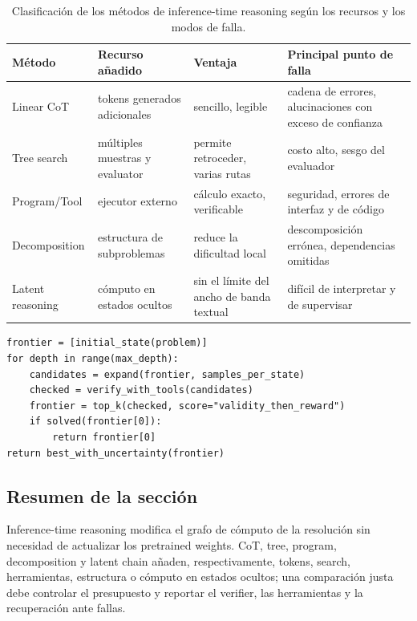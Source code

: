 \begin{table}[H]
\centering
\small
\begin{tabularx}{\textwidth}{L{0.18\textwidth} X X X}
\toprule
Método & Recurso añadido & Ventaja & Principal punto de falla \\
\midrule
Linear CoT & tokens generados adicionales & sencillo, legible & cadena de errores, alucinaciones con exceso de confianza \\
Tree search & múltiples muestras y evaluator & permite retroceder, varias rutas & costo alto, sesgo del evaluador \\
Program/Tool & ejecutor externo & cálculo exacto, verificable & seguridad, errores de interfaz y de código \\
Decomposition & estructura de subproblemas & reduce la dificultad local & descomposición errónea, dependencias omitidas \\
Latent reasoning & cómputo en estados ocultos & sin el límite del ancho de banda textual & difícil de interpretar y de supervisar \\
\bottomrule
\end{tabularx}
\caption{Clasificación de los métodos de inference-time reasoning según los recursos y los modos de falla.}
\end{table}

\begin{lstlisting}[caption={Pseudocódigo de reasoning search con presupuesto limitado}]
frontier = [initial_state(problem)]
for depth in range(max_depth):
    candidates = expand(frontier, samples_per_state)
    checked = verify_with_tools(candidates)
    frontier = top_k(checked, score="validity_then_reward")
    if solved(frontier[0]):
        return frontier[0]
return best_with_uncertainty(frontier)
\end{lstlisting}

\subsection{Resumen de la sección}

Inference-time reasoning modifica el grafo de cómputo de la resolución sin necesidad de actualizar los pretrained weights. CoT, tree, program, decomposition y latent chain añaden, respectivamente, tokens, search, herramientas, estructura o cómputo en estados ocultos; una comparación justa debe controlar el presupuesto y reportar el verifier, las herramientas y la recuperación ante fallas.
